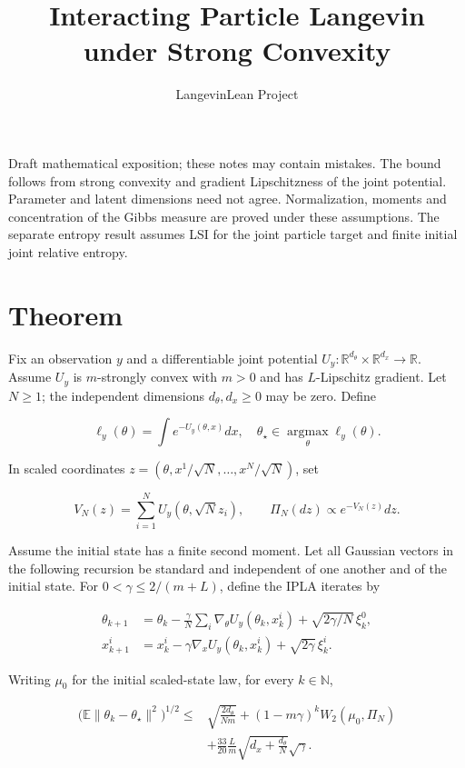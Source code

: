 \documentclass[11pt,a4paper]{article}
\title{\texorpdfstring{Interacting Particle Langevin under Strong Convexity}{Interacting Particle Langevin under Strong Convexity}}
\author{LangevinLean Project}
\date{}
\begin{document}
\maketitle
Draft mathematical exposition; these notes may contain mistakes.
The bound follows from strong convexity and gradient Lipschitzness of the joint potential. Parameter and latent dimensions need not agree. Normalization, moments and concentration of the Gibbs measure are proved under these assumptions. The separate entropy result assumes LSI for the joint particle target and finite initial joint relative entropy.
\section{\texorpdfstring{Theorem}{Theorem}}


Fix an observation \(y\) and a differentiable joint potential \(U_y:\mathbb R^{d_\theta}\times\mathbb R^{d_x}\to\mathbb R\). Assume \(U_y\) is \(m\)-strongly convex with \(m>0\) and has \(L\)-Lipschitz gradient. Let \(N\ge1\); the independent dimensions \(d_\theta,d_x\ge0\) may be zero. Define


\[\ell_y(\theta)=\int e^{-U_y(\theta,x)}dx,\quad
\theta_\star\in\operatorname*{argmax}_\theta\ell_y(\theta).\]


In scaled coordinates \(z=(\theta,x^1/\sqrt N,\ldots,x^N/\sqrt N)\), set


\[V_N(z)=\sum_{i=1}^NU_y(\theta,\sqrt N z_i),\qquad
\Pi_N(dz)\propto e^{-V_N(z)}dz.\]


Assume the initial state has a finite second moment. Let all Gaussian vectors in the following recursion be standard and independent of one another and of the initial state. For \(0<\gamma\le2/(m+L)\), define the IPLA iterates by


\[\begin{aligned}
\theta_{k+1}&=\theta_k-\frac\gamma N\sum_i\nabla_\theta U_y(\theta_k,x_k^i)+\sqrt{2\gamma/N}\,\xi_k^0,\\
x_{k+1}^i&=x_k^i-\gamma\nabla_xU_y(\theta_k,x_k^i)+\sqrt{2\gamma}\,\xi_k^i.
\end{aligned}\]


Writing \(\mu_0\) for the initial scaled-state law, for every \(k\in\mathbb N\),


\[\begin{aligned}
\bigl(\mathbb E\|\theta_k-\theta_\star\|^2\bigr)^{1/2}
\le{}&\sqrt{\frac{2d_\theta}{Nm}}+(1-m\gamma)^kW_2(\mu_0,\Pi_N)\\
&+\frac{33}{20}\frac Lm\sqrt{d_x+\frac{d_\theta}{N}}\sqrt\gamma.
\end{aligned}\]
\end{document}
